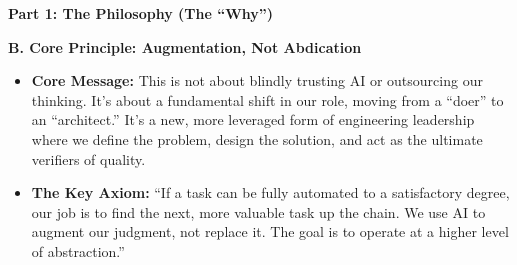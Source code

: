 \documentclass[
  ignorenonframetext,
  aspectratio=169,
]{beamer}
\providecommand{\tightlist}{%
  \setlength{\itemsep}{0pt}\setlength{\parskip}{0pt}}
\begin{document}
\begin{frame}{\textbf{Part 1: The Philosophy (The ``Why'')}}
\begin{block}{\textbf{B. Core Principle: Augmentation, Not Abdication}}
\label{b.-core-principle-augmentation-not-abdication}
\begin{itemize}
\tightlist
\item
  \textbf{Core Message:} This is not about blindly trusting AI or
  outsourcing our thinking. It's about a fundamental shift in our role,
  moving from a ``doer'' to an ``architect.'' It's a new, more leveraged
  form of engineering leadership where we define the problem, design the
  solution, and act as the ultimate verifiers of quality.\\
\item
  \textbf{The Key Axiom:} ``If a task can be fully automated to a
  satisfactory degree, our job is to find the next, more valuable task
  up the chain. We use AI to augment our judgment, not replace it. The
  goal is to operate at a higher level of abstraction.''
\end{itemize}
\end{block}
\end{frame}
\end{document}

